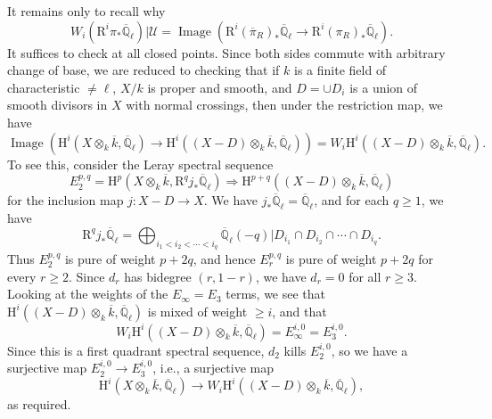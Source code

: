 It remains only to recall why
\[
W_i(\mathrm{R}^i\pi_*\overline{\mathbb{Q}}_\ell)|\mathcal{U}
=\operatorname{Image}(\mathrm{R}^i(\overline{\pi}_R)_*\overline{\mathbb{Q}}_\ell\to\mathrm{R}^i(\pi_R)_*\overline{\mathbb{Q}}_\ell).
\]
It suffices to check at all closed points. Since both sides commute with arbitrary change of base, we are reduced to checking that if \(k\) is a finite field of characteristic \(\ne\ell\), \(X/k\) is proper and smooth, and \(D=\cup D_i\) is a union of smooth divisors in \(X\) with normal crossings, then under the restriction map, we have
\[
\operatorname{Image}(\mathrm{H}^i(X\otimes_k\overline{k},\overline{\mathbb{Q}}_\ell)\to
\mathrm{H}^i((X-D)\otimes_k\overline{k},\overline{\mathbb{Q}}_\ell))
=W_i\mathrm{H}^i((X-D)\otimes_k\overline{k},\overline{\mathbb{Q}}_\ell).
\]
To see this, consider the Leray spectral sequence
\[
E_2^{p,q}=\mathrm{H}^p(X\otimes_k\overline{k},\mathrm{R}^qj_*\overline{\mathbb{Q}}_\ell)
\Rightarrow\mathrm{H}^{p+q}((X-D)\otimes_k\overline{k},\overline{\mathbb{Q}}_\ell)
\]
for the inclusion map \(j:X-D\to X\). We have \(j_*\overline{\mathbb{Q}}_\ell=\overline{\mathbb{Q}}_\ell\), and for each \(q\geq1\), we have
\[
\mathrm{R}^qj_*\overline{\mathbb{Q}}_\ell
=\bigoplus_{i_1<i_2<\cdots<i_q}\overline{\mathbb{Q}}_\ell(-q)|D_{i_1}\cap D_{i_2}\cap\cdots\cap D_{i_q}.
\]
Thus \(E_2^{p,q}\) is pure of weight \(p+2q\), and hence \(E_r^{p,q}\) is pure of weight \(p+2q\) for every \(r\geq2\). Since \(d_r\) has bidegree \((r,1-r)\), we have \(d_r=0\) for all \(r\geq3\). Looking at the weights of the \(E_\infty=E_3\) terms, we see that \(\mathrm{H}^i((X-D)\otimes_k\overline{k},\overline{\mathbb{Q}}_\ell)\) is mixed of weight \(\geq i\), and that
\[
W_i\mathrm{H}^i((X-D)\otimes_k\overline{k},\overline{\mathbb{Q}}_\ell)=E_\infty^{i,0}=E_3^{i,0}.
\]
Since this is a first quadrant spectral sequence, \(d_2\) kills \(E_2^{i,0}\), so we have a surjective map \(E_2^{i,0}\to E_3^{i,0}\), i.e., a surjective map
\[
\mathrm{H}^i(X\otimes_k\overline{k},\overline{\mathbb{Q}}_\ell)\to
W_i\mathrm{H}^i((X-D)\otimes_k\overline{k},\overline{\mathbb{Q}}_\ell),
\]
as required.

